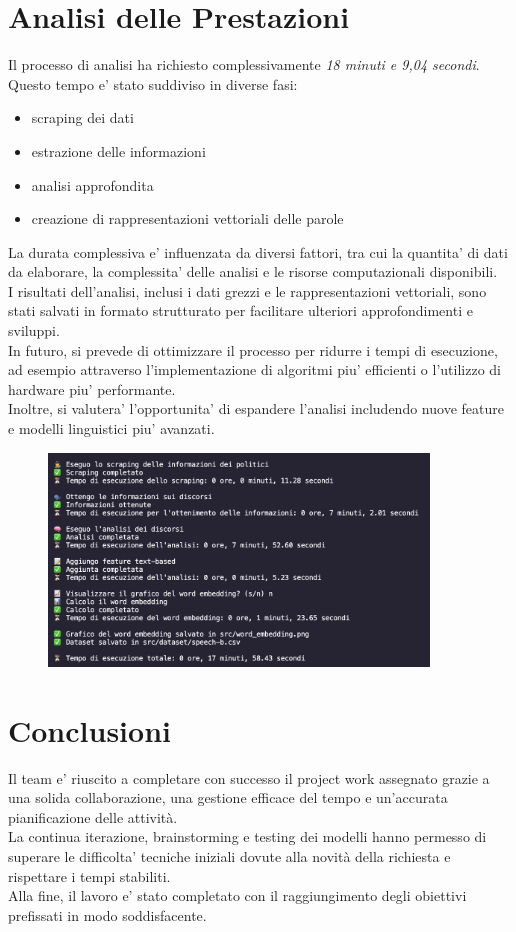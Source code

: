 \documentclass{article}
\begin{document}
\section{Analisi delle Prestazioni}
Il processo di analisi ha richiesto complessivamente \textit{18 minuti e 9,04 secondi}. \\ Questo tempo e' stato suddiviso in diverse fasi: 
\begin{itemize}
	\item scraping dei dati
	\item estrazione delle informazioni
	\item analisi approfondita
	\item creazione di rappresentazioni vettoriali delle parole
\end{itemize}
La durata complessiva e' influenzata da diversi fattori, tra cui la quantita' di dati da elaborare, la complessita' delle analisi e le risorse computazionali disponibili.
\\
I risultati dell'analisi, inclusi i dati grezzi e le rappresentazioni vettoriali, sono stati salvati in formato strutturato per facilitare ulteriori approfondimenti e sviluppi.\\ In futuro, si prevede di ottimizzare il processo per ridurre i tempi di esecuzione, ad esempio attraverso l'implementazione di algoritmi piu' efficienti o l'utilizzo di hardware piu' performante. \\Inoltre, si valutera' l'opportunita' di espandere l'analisi includendo nuove feature e modelli linguistici piu' avanzati.
	\begin{figure}[H]
	\centering
	\includegraphics[width=0.9\textwidth]{immagini/tempoesecuzione}
\end{figure}
\newpage
\section{Conclusioni}
Il team e' riuscito a completare con successo il project work assegnato grazie a una solida collaborazione, una gestione efficace del tempo e un'accurata pianificazione delle attività.  \\La continua iterazione, brainstorming e testing dei modelli hanno permesso di superare le difficolta' tecniche iniziali dovute alla novità della richiesta e rispettare i tempi stabiliti. \\Alla fine, il lavoro e' stato completato con il raggiungimento degli obiettivi prefissati in modo soddisfacente.
\end{document}
